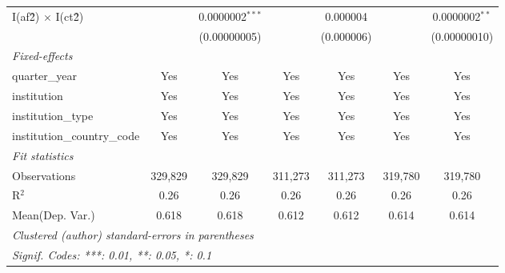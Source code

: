 \begin{tabular}{lcccccc}
   I(af\^2) $\times$ I(ct\^2)         &               & 0.0000002$^{***}$ &               & 0.000004        &               & 0.0000002$^{**}$\\   
                                      &               & (0.00000005)      &               & (0.000006)      &               & (0.00000010)\\   
   \midrule
   \emph{Fixed-effects}\\
   quarter\_year                      & Yes           & Yes               & Yes           & Yes             & Yes           & Yes\\  
   institution                        & Yes           & Yes               & Yes           & Yes             & Yes           & Yes\\  
   institution\_type                  & Yes           & Yes               & Yes           & Yes             & Yes           & Yes\\  
   institution\_country\_code         & Yes           & Yes               & Yes           & Yes             & Yes           & Yes\\  
   \midrule
   \emph{Fit statistics}\\
   Observations                       & 329,829       & 329,829           & 311,273       & 311,273         & 319,780       & 319,780\\  
   R$^2$                              & 0.26          & 0.26              & 0.26          & 0.26            & 0.26          & 0.26\\  
Mean(Dep. Var.) & 0.618 & 0.618 & 0.612 & 0.612 & 0.614 & 0.614 \\
   \midrule \midrule
   \multicolumn{7}{l}{\emph{Clustered (author) standard-errors in parentheses}}\\
   \multicolumn{7}{l}{\emph{Signif. Codes: ***: 0.01, **: 0.05, *: 0.1}}\\
\end{tabular}
\par\endgroup
